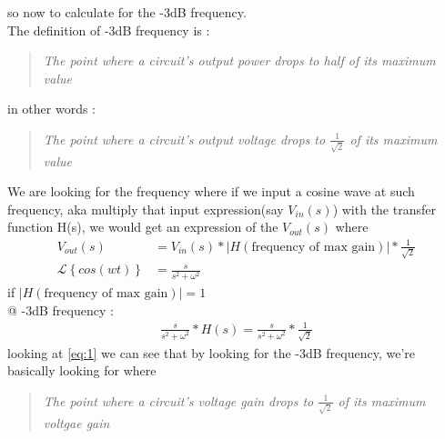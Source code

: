 \documentclass{article}
\begin{document}
    so now to calculate for the -3dB frequency.\\
    The definition of -3dB frequency is :\\
    \begin{quote}
        \textit{The point where a circuit's output power drops to half of its maximum value}\\
    \end{quote}
    in other words :\\
    \begin{quote}
    \textit{The point where a circuit's output voltage drops to $\frac{1}{\sqrt{2}}$ of its maximum value}\\
    \end{quote}
    We are looking for the frequency where if we input a cosine wave at such frequency, aka multiply that input expression(say $V_{in}(s)$) with the transfer function H(s), we would get an expression of the $V_{out}(s)$ where 
    \begin{align}
        V_{out}(s) &= V_{in}(s) * |H(\text{frequency of max gain})| * \frac{1}{\sqrt{2}}\label{eq:1}\\
        \mathcal{L}\left\{cos(wt)\right\} &= \frac{s}{s^2 + \omega^2}
    \end{align}
    if $|H(\text{frequency of max gain})| = 1$\\
    @ -3dB frequency :
    \begin{align*}
        \frac{s}{s^2 + \omega^2} * H(s) = \frac{s}{s^2 + \omega^2} * \frac{1}{\sqrt{2}}
    \end{align*}
    looking at \eqref{eq:1} we can see that by looking for the -3dB frequency, we're basically looking for where
    \begin{quote}
        \textit{The point where a circuit's voltage gain drops to $\frac{1}{\sqrt{2}}$ of its maximum voltgae gain}\\
    \end{quote}
\end{document}
